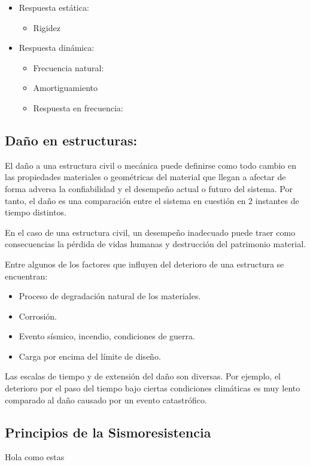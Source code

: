 \begin{itemize}
    \item{Respuesta estática:}
        \begin{itemize}
            \item Rigidez
        \end{itemize}

    \item{Respuesta dinámica:}
        \begin{itemize}
            \item Frecuencia natural:
            \item Amortiguamiento
            \item Respuesta en frecuencia:
        \end{itemize}
\end{itemize}


\subsection{Daño en estructuras:}

El daño a una estructura civil o mecánica puede definirse como todo cambio en las propiedades materiales o geométricas del material que llegan a afectar de forma adversa la confiabilidad y el desempeño actual o futuro del sistema. Por tanto, el daño es una comparación entre el sistema en cuestión en 2 instantes de tiempo distintos.

En el caso de una estructura civil, un desempeño inadecuado puede traer como consecuencias la pérdida de vidas humanas y destrucción del patrimonio material.

Entre algunos de los factores que influyen del deterioro de una estructura se encuentran:
    
        \begin{itemize}
            \item Proceso de degradación natural de los materiales.
            \item Corrosión.
            \item Evento sísmico, incendio, condiciones de guerra.
            \item Carga por encima del límite de diseño.
        \end{itemize}
    
Las escalas de tiempo y de extensión del daño son diversas. Por ejemplo, el deterioro por el paso del tiempo bajo ciertas condiciones climáticas es muy lento comparado al daño causado por un evento catastrófico.

\subsection{Principios de la Sismoresistencia}

Hola como estas \cite{farrar2007introduction}
